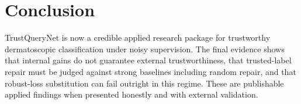 \documentclass[11pt]{article}
\begin{document}
\section{Conclusion}

TrustQueryNet is now a credible applied research package for trustworthy dermatoscopic classification under noisy supervision. The final evidence shows that internal gains do not guarantee external trustworthiness, that trusted-label repair must be judged against strong baselines including random repair, and that robust-loss substitution can fail outright in this regime. These are publishable applied findings when presented honestly and with external validation.



\end{document}
